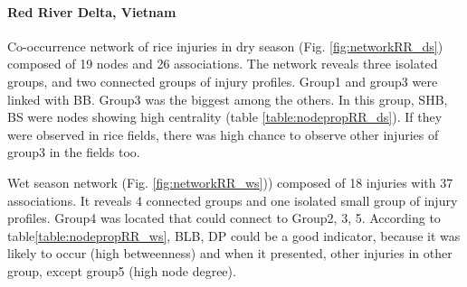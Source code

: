 \paragraph{Red River Delta, Vietnam}
 
Co-occurrence network of rice injuries in dry season (Fig. \ref{fig:networkRR_ds}) composed of 19 nodes and 26 associations. The network reveals three isolated groups, and two connected groups of injury profiles. Group1 and group3 were linked with BB. Group3 was the biggest among the others. In this group, SHB, BS were nodes showing high centrality (table \ref{table:nodepropRR_ds}). If they were observed in rice fields, there was high chance to observe other injuries of group3 in the fields too.

Wet season network (Fig. \ref{fig:networkRR_ws})) composed of 18 injuries with 37 associations. It reveals 4 connected groups and one isolated small group of injury profiles. Group4 was located that could connect to Group2, 3, 5. According to table\ref{table:nodepropRR_ws}, BLB, DP could be a good indicator, because it was likely to occur (high betweenness) and when it presented, other injuries in other group, except group5 (high node degree). 


